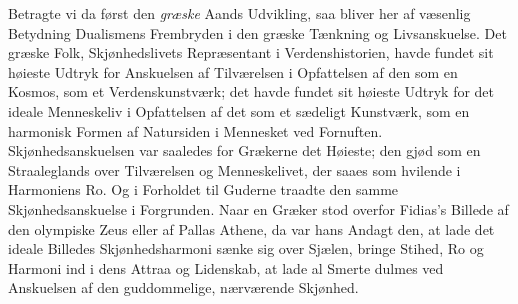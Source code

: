 \documentclass[12pt,a4paper,openany]{book}
\begin{document}
Betragte vi da først den \emph{græske} Aands Udvikling, saa
bliver her af væsenlig Betydning Dualismens Frembryden
i den græske Tænkning og Livsanskuelse. Det græske Folk,
Skjønhedslivets Repræsentant i Verdenshistorien, havde fundet
sit høieste Udtryk for Anskuelsen af Tilværelsen i Opfattelsen
af den som en Kosmos, som et Verdenskunstværk; det havde
fundet sit høieste Udtryk for det ideale Menneskeliv i Opfattelsen
af det som et sædeligt Kunstværk, som en harmonisk
Formen af Natursiden i Mennesket ved Fornuften. Skjønhedsanskuelsen
var saaledes for Grækerne det Høieste; den
gjød som en Straaleglands over Tilværelsen og Menneskelivet,
der saaes som hvilende i Harmoniens Ro. Og i Forholdet
til Guderne traadte den samme Skjønhedsanskuelse
i Forgrunden. Naar en Græker stod overfor Fidias’s
Billede af den olympiske Zeus eller af Pallas Athene, da
var hans Andagt den, at lade det ideale Billedes Skjønhedsharmoni
sænke sig over Sjælen, bringe Stihed, Ro og
Harmoni ind i dens Attraa og Lidenskab, at lade al Smerte
dulmes ved Anskuelsen af den guddommelige, nærværende
Skjønhed.
\end{document}
